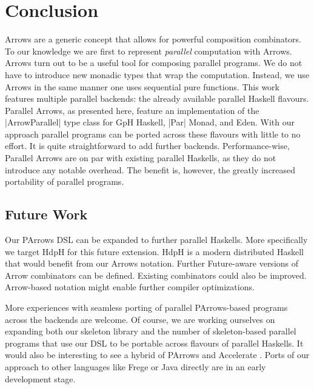 
\section{Conclusion}
\label{sec:conclusion}
Arrows are a generic concept that allows for powerful composition
combinators. To our knowledge we are first to represent
\emph{parallel} computation with Arrows.
%
Arrows turn out to be a useful tool for composing parallel
programs. We do not have to introduce new monadic types that wrap the
computation. Instead, we use Arrows in the same manner one uses sequential pure functions. 
%
This work features multiple parallel backends: the already available parallel Haskell flavours. Parallel Arrows, as presented here, feature an implementation of the |ArrowParallel| type class for GpH Haskell, |Par| Monad, and Eden. With our approach parallel programs can be ported across these flavours with little to no effort. It is quite straightforward to add further backends. 
%
%
Performance-wise, Parallel Arrows are on par with existing parallel Haskells, as they do not introduce any notable overhead.
%
The benefit is, however, the greatly increased portability of parallel programs.



\subsection{Future Work}
\label{sec:future-work}

Our PArrows DSL can be expanded to further parallel Haskells. More specifically we target HdpH \cite{Maier:2014:HDS:2775050.2633363} for this future extension. HdpH is a modern distributed Haskell that would benefit from our Arrows notation. Further Future-aware versions of Arrow combinators can be defined. Existing combinators could also be improved.
Arrow-based notation might enable further compiler optimizations.

More experiences with seamless porting of parallel PArrows-based programs across the backends are welcome.
Of course, we are working ourselves on expanding both our skeleton library and the number of skeleton-based parallel programs that use our DSL to be portable across flavours of parallel Haskells.
It would also be interesting to see a hybrid of PArrows and Accelerate \cite{McDonell:2015:TRC:2887747.2804313}.
Ports of our approach to other languages like Frege or Java directly are in an early development stage.
